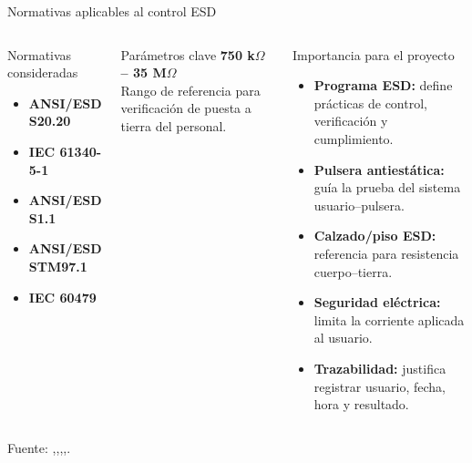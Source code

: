 \documentclass[aspectratio=169]{beamer}
\begin{document}
\begin{frame}{Normativas aplicables al control ESD}

\small

\begin{columns}[T]


    \begin{block}{Normativas consideradas}
        \begin{itemize}
            \item \textbf{ANSI/ESD S20.20}
            \item \textbf{IEC 61340-5-1}
            \item \textbf{ANSI/ESD S1.1}
            \item \textbf{ANSI/ESD STM97.1}
            \item \textbf{IEC 60479}
        \end{itemize}
    \end{block}

    \vspace{0.15cm}

    \begin{alertblock}{Parámetros clave}
        \centering
        \textbf{750 k$\Omega$ -- 35 M$\Omega$}\\
        \scriptsize Rango de referencia para verificación de puesta a tierra del personal.
    \end{alertblock}


    \begin{block}{Importancia para el proyecto}
        \begin{itemize}
            \item \textbf{Programa ESD:} define prácticas de control, verificación y cumplimiento.
            \item \textbf{Pulsera antiestática:} guía la prueba del sistema usuario--pulsera.
            \item \textbf{Calzado/piso ESD:} referencia para resistencia cuerpo--tierra.
            \item \textbf{Seguridad eléctrica:} limita la corriente aplicada al usuario.
            \item \textbf{Trazabilidad:} justifica registrar usuario, fecha, hora y resultado.
        \end{itemize}
    \end{block}

\end{columns}

\vspace{0.1cm}

{\scriptsize Fuente: \cite{ANSI_S2020_Blog},\cite{S1_1_ANSI},\cite{STM97_ANSI},\cite{IEC61340_Preview},\cite{IEC60479}}.

\end{frame}
\end{document}
